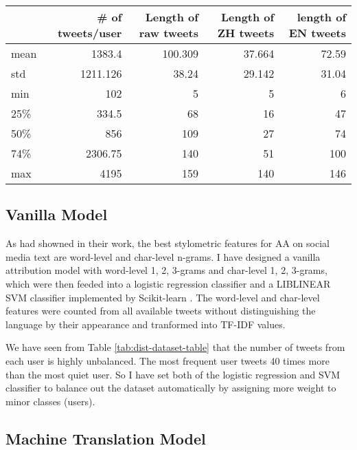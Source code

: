 \documentclass[11pt,a4paper]{article}
\begin{document}
\begin{table*}[t]
  \begin{center}
  \begin{tabular}{|l|r|r|r|r|}
  \hline & \bf \# of tweets/user & \bf Length of raw tweets & \bf Length of ZH tweets & \bf length of EN tweets \\ \hline
  mean & 1383.4 & 100.309 & 37.664 & 72.59 \\
  std & 1211.126 & 38.24 & 29.142 & 31.04  \\
  min & 102 & 5 & 5 & 6 \\
  25\% & 334.5 & 68 & 16 & 47 \\
  50\% & 856 & 109 & 27 & 74 \\
  74\% & 2306.75 & 140 & 51 & 100 \\
  max & 4195 & 159 & 140 & 146 \\
  \hline
  \end{tabular}
  \end{center}
  \caption{\label{tab:dist-dataset-table} Distribution of the Dataset}
\end{table*}

\subsection{Vanilla Model}

As \citet{rocha2016authorship} had showned in their work, the best stylometric features for AA on social media text are word-level and char-level n-grams. I have designed a vanilla attribution model with word-level 1, 2, 3-grams and char-level 1, 2, 3-grams, which were then feeded into a logistic regression classifier and a LIBLINEAR SVM classifier \cite{REF08a} implemented by Scikit-learn \cite{scikit-learn}. The word-level and char-level features were counted from all available tweets without distinguishing the language by their appearance and tranformed into TF-IDF values.

We have seen from Table \ref{tab:dist-dataset-table} that the number of tweets from each user is highly unbalanced. The most frequent user tweets 40 times more than the most quiet user. So I have set both of the logistic regression and SVM classifier to balance out the dataset automatically by assigning more weight to minor classes (users).

\subsection{Machine Translation Model}
\end{document}
